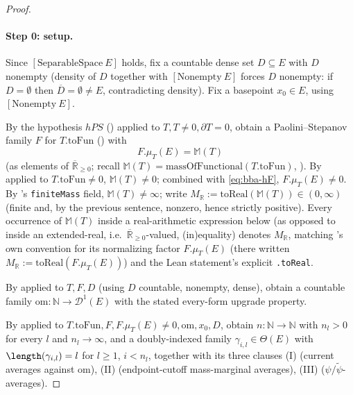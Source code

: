 \begin{proof}
  \paragraph{Step 0: setup.} Since $[\mathrm{SeparableSpace}\ E]$ holds, fix a countable dense set
  $D\subseteq E$ with $D$ nonempty (density of $D$ together with $[\mathrm{Nonempty}\ E]$ forces
  $D$ nonempty: if $D=\emptyset$ then $\overline D=\emptyset\ne E$, contradicting density). Fix a
  basepoint $x_0\in E$, using $[\mathrm{Nonempty}\ E]$.

  By the hypothesis $hPS$ () applied to $T,T\ne0,\partial T=0$,
  obtain a Paolini--Stepanov family $F$ for $T.\mathrm{toFun}$ () with
  \begin{equation}\label{eq:bba-hF}
    F.\mu_T(E) = \mathbb M(T)
    \tag{hF}
  \end{equation}
  (as elements of $\overline{\mathbb R}_{\ge0}$; recall $\mathbb M(T)=\mathrm{massOfFunctional}(T.\mathrm{toFun})$,
  ). By  applied to $T.\mathrm{toFun}\ne0$,
  $\mathbb M(T)\ne0$; combined with \eqref{eq:bba-hF}, $F.\mu_T(E)\ne0$. By
  's \texttt{finiteMass} field, $\mathbb M(T)\ne\infty$; write
  $M_{\mathbb R} := \mathrm{toReal}(\mathbb M(T)) \in (0,\infty)$ (finite and, by the previous
  sentence, nonzero, hence strictly positive). Every occurrence of $\mathbb M(T)$ inside a
  real-arithmetic expression below (as opposed to inside an extended-real, i.e.\ $\overline{\mathbb
  R}_{\ge0}$-valued, (in)equality) denotes $M_{\mathbb R}$, matching 's own
  convention for its normalizing factor $F.\mu_T(E)$ (there written $M_{\mathbb R} :=
  \mathrm{toReal}(F.\mu_T(E))$) and the Lean statement's explicit \texttt{.toReal}.

  By  applied to $T,F,D$ (using $D$ countable, nonempty, dense),
  obtain a countable family $\mathrm{om}\colon\mathbb N\to\mathcal D^1(E)$ with the stated
  every-form upgrade property.

  By  applied to $T.\mathrm{toFun},F,F.\mu_T(E)\ne0,\mathrm{om},x_0,D$,
  obtain $n\colon\mathbb N\to\mathbb N$ with $n_l>0$ for every $l$ and $n_l\to\infty$, and a
  doubly-indexed family $\gamma_{i,l}\in\Theta(E)$ with $\length(\gamma_{i,l})=l$ for $l\ge1$,
  $i<n_l$, together with its three clauses (I) (current averages against $\mathrm{om}$), (II)
  (endpoint-cutoff mass-marginal averages), (III) ($\psi/\tilde\psi$-averages).


\end{proof}

